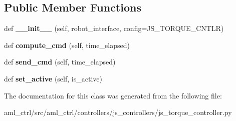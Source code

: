 \subsection*{Public Member Functions}
\begin{DoxyCompactItemize}
\item 
\hypertarget{classaml__ctrl_1_1controllers_1_1js__controllers_1_1js__torque__controller_1_1_j_s_torque_controller_a6c4438a0f7de1511e34fff8dd78f6999}{}\label{classaml__ctrl_1_1controllers_1_1js__controllers_1_1js__torque__controller_1_1_j_s_torque_controller_a6c4438a0f7de1511e34fff8dd78f6999} 
def {\bfseries \+\_\+\+\_\+init\+\_\+\+\_\+} (self, robot\+\_\+interface, config=J\+S\+\_\+\+T\+O\+R\+Q\+U\+E\+\_\+\+C\+N\+T\+LR)
\item 
\hypertarget{classaml__ctrl_1_1controllers_1_1js__controllers_1_1js__torque__controller_1_1_j_s_torque_controller_a1f6cfa660a0b6e9f123c544bac73a8b2}{}\label{classaml__ctrl_1_1controllers_1_1js__controllers_1_1js__torque__controller_1_1_j_s_torque_controller_a1f6cfa660a0b6e9f123c544bac73a8b2} 
def {\bfseries compute\+\_\+cmd} (self, time\+\_\+elapsed)
\item 
\hypertarget{classaml__ctrl_1_1controllers_1_1js__controllers_1_1js__torque__controller_1_1_j_s_torque_controller_a339d1c5d2acc1859605f5c87200a88bf}{}\label{classaml__ctrl_1_1controllers_1_1js__controllers_1_1js__torque__controller_1_1_j_s_torque_controller_a339d1c5d2acc1859605f5c87200a88bf} 
def {\bfseries send\+\_\+cmd} (self, time\+\_\+elapsed)
\item 
\hypertarget{classaml__ctrl_1_1controllers_1_1js__controllers_1_1js__torque__controller_1_1_j_s_torque_controller_ad422e4ee2a27feaa48be0d483ab3132d}{}\label{classaml__ctrl_1_1controllers_1_1js__controllers_1_1js__torque__controller_1_1_j_s_torque_controller_ad422e4ee2a27feaa48be0d483ab3132d} 
def {\bfseries set\+\_\+active} (self, is\+\_\+active)
\end{DoxyCompactItemize}


The documentation for this class was generated from the following file\+:\begin{DoxyCompactItemize}
\item 
aml\+\_\+ctrl/src/aml\+\_\+ctrl/controllers/js\+\_\+controllers/js\+\_\+torque\+\_\+controller.\+py\end{DoxyCompactItemize}
